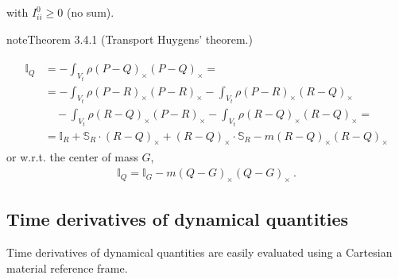 \documentclass[letterpaper,10pt,english]{jupyterBook}
\begin{document}
\sphinxAtStartPar
with \(I_{ii}^0 \ge 0\) (no sum).
\label{ch/inertia:thm:huygens}
\begin{sphinxadmonition}{note}{Theorem 3.4.1 (Transport \sphinxhyphen{} Huygens’ theorem.)}


\begin{equation*}
\begin{split}\begin{aligned}
  \mathbb{I}_Q 
  & = - \int_{V_t} \rho (P - Q)_{\times} (P-Q)_{\times} = \\
  & =    - \int_{V_t} \rho (P - R)_{\times} (P - R)_{\times}     
         - \int_{V_t} \rho (P - R)_{\times} (R - Q)_{\times} \\  
& \quad  - \int_{V_t} \rho (R - Q)_{\times} (P - R)_{\times}     
         - \int_{V_t} \rho (R - Q)_{\times} (R - Q)_{\times} = \\ 
  & = \mathbb{I}_R + \mathbb{S}_R \cdot (R-Q)_{\times} + (R-Q)_{\times} \cdot \mathbb{S}_R - m (R - Q)_{\times} (R - Q)_{\times}
\end{aligned}\end{split}
\end{equation*}
\sphinxAtStartPar
or w.r.t. the center of mass \(G\),
\begin{equation*}
\begin{split} \mathbb{I}_Q = \mathbb{I}_G - m (Q-G)_\times (Q-G)_\times \ .\end{split}
\end{equation*}\end{sphinxadmonition}


\subsection{Time derivatives of dynamical quantities}
\label{\detokenize{ch/inertia:time-derivatives-of-dynamical-quantities}}
\sphinxAtStartPar
Time derivatives of dynamical quantities are easily evaluated using a Cartesian material reference frame.
\end{document}
